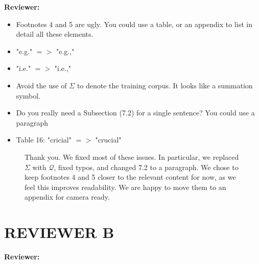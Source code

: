 \documentclass[10pt]{article}
\begin{document}
{\flushleft \textbf{Reviewer:} }

\begin{itemize}
\item Footnotes 4 and 5 are ugly. You could use a table, or an appendix to list
in detail all these elements. 
\item "e.g." $=>$ "e.g.,"
\item "i.e." $=>$ "i.e.,"
\item Avoid the use of $\Sigma$ to denote the training corpus. It looks like a
summation symbol.
\item Do you really need a Subsection (7.2) for a single sentence? You could use
a \\paragraph
\item Table 16: "cricial" $=>$ "crucial" 
\end{itemize}
 
\begin{figure}[H]
\caption{Thank you. We fixed most of these issues. In particular, we replaced $\Sigma$ with $\mathcal{Q}$, fixed typos, and changed 7.2 to a paragraph. We chose to keep footnotes 4 and 5 closer to the relevant content for now, as we feel this improves readability. We are happy to move them to an appendix for camera ready.}
\end{figure}


\section{REVIEWER B}


{\flushleft \textbf{Reviewer:} }
\end{document}
